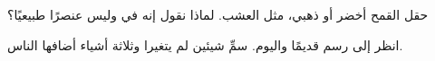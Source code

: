 \begin{exercise}[$\star\star$]\label{exo:g1:landscapes-around-us:10}
حقل القمح أخضر أو ذهبي، مثل العشب. لماذا نقول إنه 
في  وليس عنصرًا طبيعيًا؟
\end{exercise}

\begin{exercise}[$\star\star$]\label{exo:g1:landscapes-around-us:11}
انظر إلى رسم  قديمًا واليوم. سمِّ شيئين لم يتغيرا وثلاثة أشياء
أضافها الناس.
\end{exercise}
